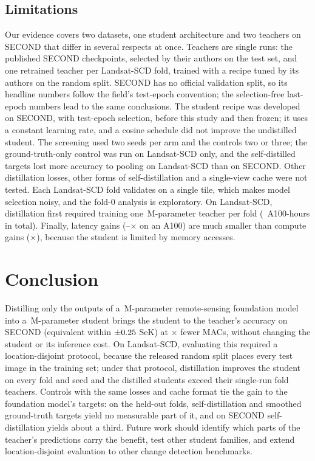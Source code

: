 \documentclass[journal]{IEEEtran}
\begin{document}
\subsection{Limitations}
\label{sec:limitations}
Our evidence covers two datasets, one student architecture and two teachers on SECOND that differ
in several respects at once. Teachers are single runs: the published SECOND checkpoints, selected
by their authors on the test set, and one retrained teacher per Landsat-SCD fold, trained with a
recipe tuned by its authors on the random split. SECOND has no official validation split, so its
headline numbers follow the field's test-epoch convention; the selection-free last-epoch numbers
lead to the same conclusions. The student recipe was developed on SECOND, with test-epoch
selection, before this study and then frozen; it uses a constant learning rate, and a cosine schedule did not improve the
undistilled student. The screening used two seeds per arm and the controls two or three; the
ground-truth-only control was run on Landsat-SCD only, and the self-distilled targets lost more
accuracy to pooling on Landsat-SCD than on SECOND. Other distillation losses, other forms of
self-distillation and a single-view cache were not tested. Each
Landsat-SCD fold validates on a single tile, which makes model selection noisy, and the fold-0
analysis is exploratory. On Landsat-SCD, distillation first required training one
\TeacherParams\,M-parameter teacher per fold (\ComputeLandsatTeachers\ A100-hours in total). Finally, latency
gains (\RatioLatOneBf--\RatioLatFpThirtyTwo$\times$ on an A100) are much smaller than compute
gains (\RatioGmacs$\times$), because the student is limited by memory accesses.

\section{Conclusion}
\label{sec:conclusion}
Distilling only the outputs of a \TeacherParams\,M-parameter remote-sensing foundation model into a
\StudentParams\,M-parameter student brings the student to the teacher's accuracy on SECOND
(equivalent within $\pm0.25$ SeK) at \RatioGmacs$\times$ fewer MACs, without changing the
student or its inference cost. On Landsat-SCD, evaluating this required a location-disjoint
protocol, because the released random split places every test image in the training set; under
that protocol, distillation improves the student on every fold and seed and the distilled students
exceed their single-run fold teachers. Controls with the same losses and cache format tie the gain
to the foundation model's targets: on the held-out folds, self-distillation and smoothed
ground-truth targets yield no measurable part of it, and on SECOND self-distillation yields about a third. Future work should
identify which parts of the teacher's predictions carry the benefit, test other student families,
and extend location-disjoint evaluation to other change detection benchmarks.
\end{document}
